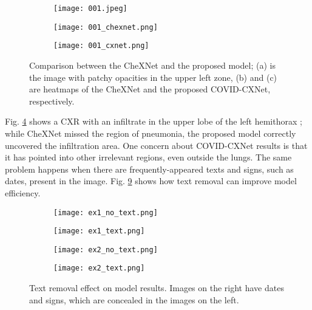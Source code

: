 \documentclass{article}
\begin{document}
\begin{figure}[H]
    \begin{subfigure}{0.33\linewidth}
        \centering
        \texttt{[image: 001.jpeg]}
        \caption{}
        \label{fig:comp_img}
    \end{subfigure}
    \hfill
    \begin{subfigure}{0.33\linewidth}
        \centering
        \texttt{[image: 001\_chexnet.png]}
        \caption{}
        \label{fig:comp_chexnet}
    \end{subfigure}
    \hfill
    \begin{subfigure}{0.33\linewidth}
        \centering
        \texttt{[image: 001\_cxnet.png]}
        \caption{}
        \label{fig:comp_cxnet}
    \end{subfigure}
\caption{Comparison between the CheXNet and the proposed model; (a) is the image with patchy opacities in the upper left zone, (b) and (c) are heatmaps of the CheXNet and the proposed COVID-CXNet, respectively.}
\label{fig:chexnet_vs_cxnet}
\end{figure}

Fig. \ref{fig:chexnet_vs_cxnet} shows a CXR with an infiltrate in the upper lobe of the left hemithorax \cite{phan2020importation}; while CheXNet missed the region of pneumonia, the proposed model correctly uncovered the infiltration area. One concern about COVID-CXNet results is that it has pointed into other irrelevant regions, even outside the lungs. The same problem happens when there are frequently-appeared texts and signs, such as dates, present in the image. Fig. \ref{fig:text_removal_effect} shows how text removal can improve model efficiency.

\begin{figure}[H]
    \begin{subfigure}[b]{0.5\linewidth}
        \centering
        \texttt{[image: ex1\_no\_text.png]}
        \caption{}
        \label{fig:no_text_ex0}
    \end{subfigure}
    \hfill
    \begin{subfigure}[b]{0.5\linewidth}
        \centering
        \texttt{[image: ex1\_text.png]}
        \caption{}
        \label{fig:with_text_ex0}
    \end{subfigure}
    \hfill
    \begin{subfigure}[b]{0.5\linewidth}
        \centering
        \texttt{[image: ex2\_no\_text.png]}
        \caption{}
        \label{fig:no_text_ex1}
    \end{subfigure}
    \hfill
    \begin{subfigure}[b]{0.5\linewidth}
        \centering
        \texttt{[image: ex2\_text.png]}
        \caption{}
        \label{fig:with_text_ex1}
    \end{subfigure}
\caption{Text removal effect on model results. Images on the right have dates and signs, which are concealed in the images on the left.}
\label{fig:text_removal_effect}
\end{figure}
\end{document}
